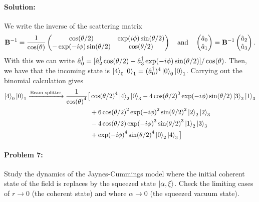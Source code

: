 \paragraph{Solution:} We write the inverse of the scattering matrix
\begin{equation}
    \vec{B}^{-1} = 
    \frac{1}{\cost}
    \begin{pmatrix}
        \costt & \expi\sintt \\
        -\expim\sintt & \costt
    \end{pmatrix}
    \textand 
    \begin{pmatrix}
        \a_0\\
        \a_1
    \end{pmatrix}
    =
    \vec{B}^{-1}
    \begin{pmatrix}
        \a_2\\
        \a_3
    \end{pmatrix}.
\end{equation}
With this we can write $\ad_0 = [\ad_2 \costt - \ad_3 \expim\sintt]/\cost$. Then, we have that the incoming state is $\ket{4}_0\ket{0}_1 = (\hat{a}^\dagger_0)^4\ket{0}_0\ket{0}_1$. Carrying out the binomial calculation gives
\begin{align}
    \ket{4}_0\ket{0}_1 \xrightarrow{\text{Beam splitter}}  \frac{1}{\cost^4}\big[  &\costt^4 \kettt{4}{0} - 4 \costt^3 \expim \sintt\kettt{3}{1}\\
     &  +6 \costt^2 \expim^2 \sintt^2 \kettt{2}{2} \\
     &- 4 \costt \expim^3 \sintt^3 \kettt{1}{3} \\
     & + \expim^4\sintt^4 \kettt{0}{4} \big]
\end{align}

\paragraph{Problem 7:} Study the dynamics of the Jaynes-Cummings model where the initial coherent state of the field is replaces by the squeezed state $\ket{\alpha,\xi}$. Check the limiting cases of $r\to 0$ (the coherent state) and where $\alpha \to 0$ (the squeezed vacuum state).

